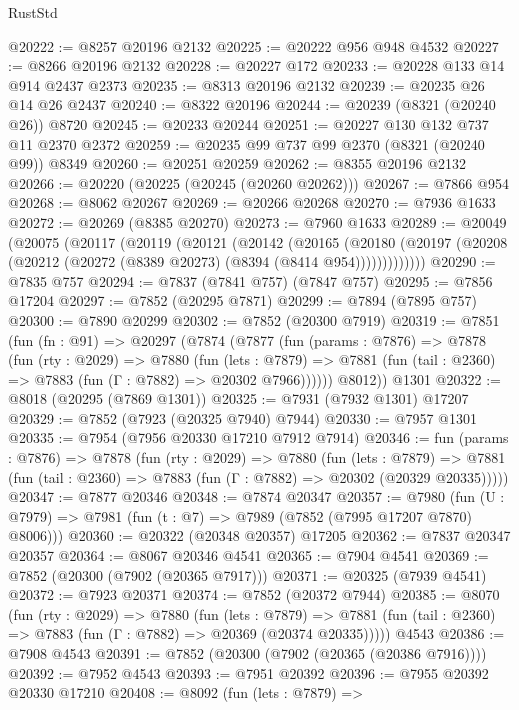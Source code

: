 \begin{lexlean}{RustStd}
\begin{coremodule}
@20222 := @8257 @20196 @2132
@20225 := @20222 @956 @948 @4532
@20227 := @8266 @20196 @2132
@20228 := @20227 @172
@20233 := @20228 @133 @14 @914 @2437 @2373
@20235 := @8313 @20196 @2132
@20239 := @20235 @26 @14 @26 @2437
@20240 := @8322 @20196
@20244 := @20239 (@8321 (@20240 @26)) @8720
@20245 := @20233 @20244
@20251 := @20227 @130 @132 @737 @11 @2370 @2372
@20259 := @20235 @99 @737 @99 @2370 (@8321 (@20240 @99)) @8349
@20260 := @20251 @20259
@20262 := @8355 @20196 @2132
@20266 := @20220 (@20225 (@20245 (@20260 @20262)))
@20267 := @7866 @954
@20268 := @8062 @20267
@20269 := @20266 @20268
@20270 := @7936 @1633
@20272 := @20269 (@8385 @20270)
@20273 := @7960 @1633
@20289 := @20049
    (@20075
      (@20117
        (@20119
          (@20121
            (@20142
              (@20165
                (@20180
                  (@20197 (@20208 (@20212 (@20272 (@8389 @20273) (@8394 (@8414 @954)))))))))))))
@20290 := @7835 @757
@20294 := @7837 (@7841 @757) (@7847 @757)
@20295 := @7856 @17204
@20297 := @7852 (@20295 @7871)
@20299 := @7894 (@7895 @757)
@20300 := @7890 @20299
@20302 := @7852 (@20300 @7919)
@20319 := @7851
    (fun (fn : @91) =>
    @20297
      (@7874
        (@7877
          (fun (params : @7876) =>
          @7878
            (fun (rty : @2029) =>
            @7880
              (fun (lets : @7879) =>
              @7881 (fun (tail : @2360) => @7883 (fun (Γ : @7882) => @20302 @7966))))))
        @8012))
    @1301
@20322 := @8018 (@20295 (@7869 @1301))
@20325 := @7931 (@7932 @1301) @17207
@20329 := @7852 (@7923 (@20325 @7940) @7944)
@20330 := @7957 @1301
@20335 := @7954 (@7956 @20330 @17210 @7912 @7914)
@20346 := fun (params : @7876) =>
  @7878
    (fun (rty : @2029) =>
    @7880
      (fun (lets : @7879) =>
      @7881 (fun (tail : @2360) => @7883 (fun (Γ : @7882) => @20302 (@20329 @20335)))))
@20347 := @7877 @20346
@20348 := @7874 @20347
@20357 := @7980
    (fun (U : @7979) => @7981 (fun (t : @7) => @7989 (@7852 (@7995 @17207 @7870) @8006)))
@20360 := @20322 (@20348 @20357) @17205
@20362 := @7837 @20347 @20357
@20364 := @8067 @20346 @4541
@20365 := @7904 @4541
@20369 := @7852 (@20300 (@7902 (@20365 @7917)))
@20371 := @20325 (@7939 @4541)
@20372 := @7923 @20371
@20374 := @7852 (@20372 @7944)
@20385 := @8070
    (fun (rty : @2029) =>
    @7880
      (fun (lets : @7879) =>
      @7881 (fun (tail : @2360) => @7883 (fun (Γ : @7882) => @20369 (@20374 @20335)))))
    @4543
@20386 := @7908 @4543
@20391 := @7852 (@20300 (@7902 (@20365 (@20386 @7916))))
@20392 := @7952 @4543
@20393 := @7951 @20392
@20396 := @7955 @20392 @20330 @17210
@20408 := @8092
    (fun (lets : @7879) =>

\end{coremodule}
\end{lexlean}
